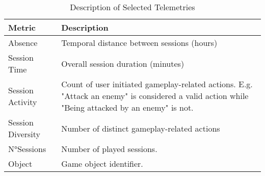 \begin{table}[H] \centering
\caption{Description of Selected Telemetries}
\label{metricsdescription}
  \begin{tabularx}{\textwidth}{@{}lX@{}}
    \toprule
    \textbf{Metric}      & \textbf{Description}          \\ \midrule
    {Absence}    & Temporal distance between sessions (hours)  \\
    {Session Time}     & Overall session duration (minutes)       \\ 
    {Session Activity}    & Count of user initiated gameplay-related actions. E.g. "Attack an enemy" is considered a valid action while "Being attacked by an enemy" is not.\\
    {Session Diversity}      & Number of distinct gameplay-related actions  \\ 
    {N°Sessions}    & Number of played sessions.\\ 
    {Object}    &  Game object identifier.  \\
    \bottomrule
  \end{tabularx}
\end{table}
